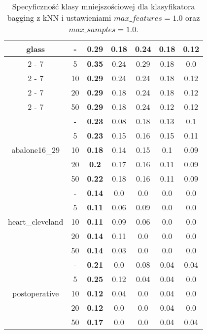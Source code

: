 \begin{table}[H]
\begin{center}
{\begin{tabular}{c|c|ccccc}
			\multirow{5}{*}{glass}&{-}&\textbf{0.29}&0.18&0.24&0.18&0.12\\%
			\cline{2%
				-%
				7}%
			&5&\textbf{0.35}&0.24&0.29&0.18&0.0\\%
			\cline{2%
				-%
				7}%
			&10&\textbf{0.29}&0.24&0.24&0.18&0.12\\%
			\cline{2%
				-%
				7}%
			&20&\textbf{0.29}&0.18&0.24&0.18&0.12\\%
			\cline{2%
				-%
				7}%
			&50&\textbf{0.29}&0.18&0.24&0.12&0.12\\%
			\hline%
			\multirow{5}{*}{abalone16\_29}&{-}&\textbf{0.23}&0.08&0.18&0.13&0.1\\%
			\cline{2%
				-%
				7}%
			&5&\textbf{0.23}&0.15&0.16&0.15&0.11\\%
			\cline{2%
				-%
				7}%
			&10&\textbf{0.18}&0.14&0.15&0.1&0.09\\%
			\cline{2%
				-%
				7}%
			&20&\textbf{0.2}&0.17&0.16&0.11&0.09\\%
			\cline{2%
				-%
				7}%
			&50&\textbf{0.22}&0.18&0.16&0.11&0.09\\%
			\hline%
			\multirow{5}{*}{heart\_cleveland}&{-}&\textbf{0.14}&0.0&0.0&0.0&0.0\\%
			\cline{2%
				-%
				7}%
			&5&\textbf{0.11}&0.06&0.09&0.0&0.0\\%
			\cline{2%
				-%
				7}%
			&10&\textbf{0.11}&0.09&0.06&0.0&0.0\\%
			\cline{2%
				-%
				7}%
			&20&\textbf{0.14}&0.11&0.0&0.0&0.0\\%
			\cline{2%
				-%
				7}%
			&50&\textbf{0.14}&0.03&0.0&0.0&0.0\\%
			\hline%
			\multirow{5}{*}{postoperative}&{-}&\textbf{0.21}&0.0&0.08&0.04&0.04\\%
			\cline{2%
				-%
				7}%
			&5&\textbf{0.25}&0.12&0.04&0.04&0.0\\%
			\cline{2%
				-%
				7}%
			&10&\textbf{0.12}&0.04&0.0&0.04&0.0\\%
			\cline{2%
				-%
				7}%
			&20&\textbf{0.12}&0.0&0.0&0.04&0.0\\%
			\cline{2%
				-%
				7}%
			&50&\textbf{0.17}&0.0&0.0&0.04&0.04\\%
			\hline%
			\end{tabular}}
			\caption{Specyficzność klasy mniejszościowej dla klasyfikatora bagging z kNN i ustawieniami $max\_features = 1.0$ oraz $max\_samples = 1.0$.}
			\label{baggingknnspec}
		\end{center}
	\end{table}
